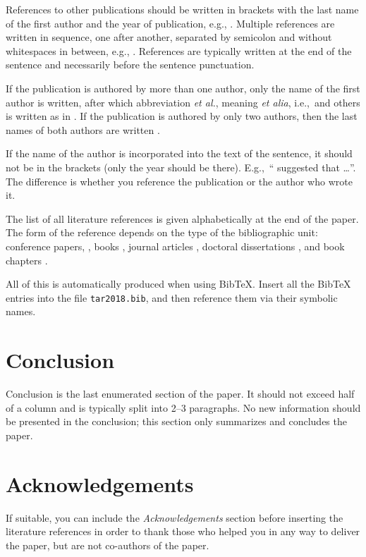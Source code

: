 \documentclass[10pt, a4paper]{article}
\begin{document}
References to other publications should be written in brackets with the last name of the first author and the year of publication, e.g., \citep{chomsky-73}.  Multiple references are written in sequence, one after another, separated by semicolon and without whitespaces in between, e.g., \citep{chomsky-73,chave-64,feigl-58}. References are typically written at the end of the sentence and necessarily before the sentence punctuation.

If the publication is authored by more than one author, only the name of the first author is written, after which abbreviation \emph{et al.}, meaning \emph{et alia}, i.e.,~and others is written as in \citep{johnson-etc}. If the publication is authored by only two authors, then the last names of both authors are written \citep{johnson-howells}.

If the name of the author is incorporated into the text of the sentence, it should not be in the brackets (only the year should be there). E.g.,~``\citet{chomsky-73}
suggested that \dots''. The difference is whether you reference the publication or the author who wrote it. 

The list of all literature references is given alphabetically at the end of the paper. The form of the reference depends on the type of the bibliographic unit: conference papers,
\citep{chave-64}, books \citep{butcher-81}, journal articles
\citep{howells-51}, doctoral dissertations \citep{croft-78}, and book chapters \citep{feigl-58}. 

All of this is automatically produced when using BibTeX. Insert all the BibTeX entries into the file \texttt{tar2018.bib}, and then reference them via their symbolic names.

\section{Conclusion}

Conclusion is the last enumerated section of the paper. It should not exceed half of a column and is typically split into 2--3 paragraphs. No new information should be presented in the conclusion; this section only summarizes and concludes the paper.

\section*{Acknowledgements}

If suitable, you can include the \textit{Acknowledgements} section before inserting the literature references  in order to thank those who helped you in any way to deliver the paper, but are not co-authors of the paper.

\nocite{*}

 
\end{document}
